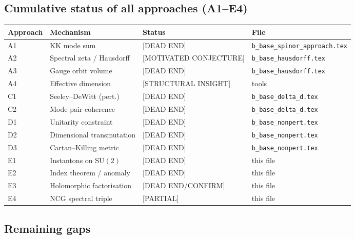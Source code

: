 \documentclass[11pt,a4paper]{article}
\theoremstyle{definition}
\theoremstyle{remark}
\begin{document}
\subsection{Cumulative status of all approaches (A1--E4)}

\begin{center}
\begin{tabular}{llll}
  \toprule
  Approach & Mechanism & Status & File \\
  \midrule
  A1 & KK mode sum & [DEAD END] & \texttt{b\_base\_spinor\_approach.tex} \\
  A2 & Spectral zeta / Hausdorff & [MOTIVATED CONJECTURE] & \texttt{b\_base\_hausdorff.tex} \\
  A3 & Gauge orbit volume & [DEAD END] & \texttt{b\_base\_hausdorff.tex} \\
  A4 & Effective dimension & [STRUCTURAL INSIGHT] & tools \\
  C1 & Seeley--DeWitt (pert.) & [DEAD END] & \texttt{b\_base\_delta\_d.tex} \\
  C2 & Mode pair coherence & [DEAD END] & \texttt{b\_base\_delta\_d.tex} \\
  D1 & Unitarity constraint & [DEAD END] & \texttt{b\_base\_nonpert.tex} \\
  D2 & Dimensional transmutation & [DEAD END] & \texttt{b\_base\_nonpert.tex} \\
  D3 & Cartan--Killing metric & [DEAD END] & \texttt{b\_base\_nonpert.tex} \\
  E1 & Instantons on $\mathrm{SU}(2)$ & [DEAD END] & this file \\
  E2 & Index theorem / anomaly & [DEAD END] & this file \\
  E3 & Holomorphic factorisation & [DEAD END/CONFIRM] & this file \\
  E4 & NCG spectral triple & [PARTIAL] & this file \\
  \bottomrule
\end{tabular}
\end{center}

\subsection{Remaining gaps}
\end{document}

